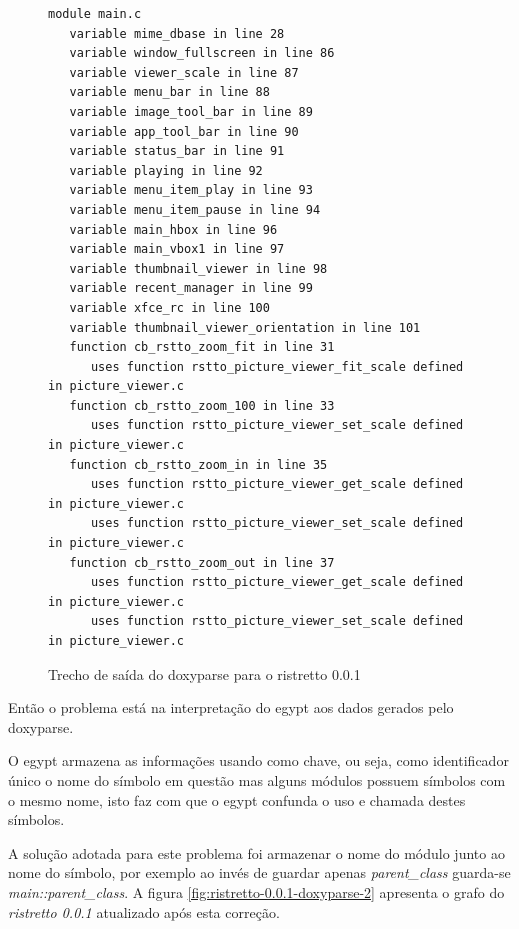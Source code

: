 \begin{figure}[h]
\begin{Verbatim}[frame=single,fontsize=\relsize{-3},fontfamily=courier]
module main.c
   variable mime_dbase in line 28
   variable window_fullscreen in line 86
   variable viewer_scale in line 87
   variable menu_bar in line 88
   variable image_tool_bar in line 89
   variable app_tool_bar in line 90
   variable status_bar in line 91
   variable playing in line 92
   variable menu_item_play in line 93
   variable menu_item_pause in line 94
   variable main_hbox in line 96
   variable main_vbox1 in line 97
   variable thumbnail_viewer in line 98
   variable recent_manager in line 99
   variable xfce_rc in line 100
   variable thumbnail_viewer_orientation in line 101
   function cb_rstto_zoom_fit in line 31
      uses function rstto_picture_viewer_fit_scale defined in picture_viewer.c
   function cb_rstto_zoom_100 in line 33
      uses function rstto_picture_viewer_set_scale defined in picture_viewer.c
   function cb_rstto_zoom_in in line 35
      uses function rstto_picture_viewer_get_scale defined in picture_viewer.c
      uses function rstto_picture_viewer_set_scale defined in picture_viewer.c
   function cb_rstto_zoom_out in line 37
      uses function rstto_picture_viewer_get_scale defined in picture_viewer.c
      uses function rstto_picture_viewer_set_scale defined in picture_viewer.c
\end{Verbatim}
\caption{Trecho de saída do doxyparse para o ristretto 0.0.1}
\label{fig:trecho-saida-doxyparse-ristretto}
\end{figure}

Então o problema está na interpretação do egypt aos dados gerados pelo
doxyparse.

O egypt armazena as informações usando como chave, ou seja, como identificador
único o nome do símbolo em questão mas alguns módulos possuem símbolos com o
mesmo nome, isto faz com que o egypt confunda o uso e chamada destes símbolos.

A solução adotada para este problema foi armazenar o nome do módulo junto ao
nome do símbolo, por exemplo ao invés de guardar apenas {\it parent\_class}
guarda-se {\it main::parent\_class}. A figura
\ref{fig:ristretto-0.0.1-doxyparse-2} apresenta o grafo do {\it ristretto 0.0.1}
atualizado após esta correção.

